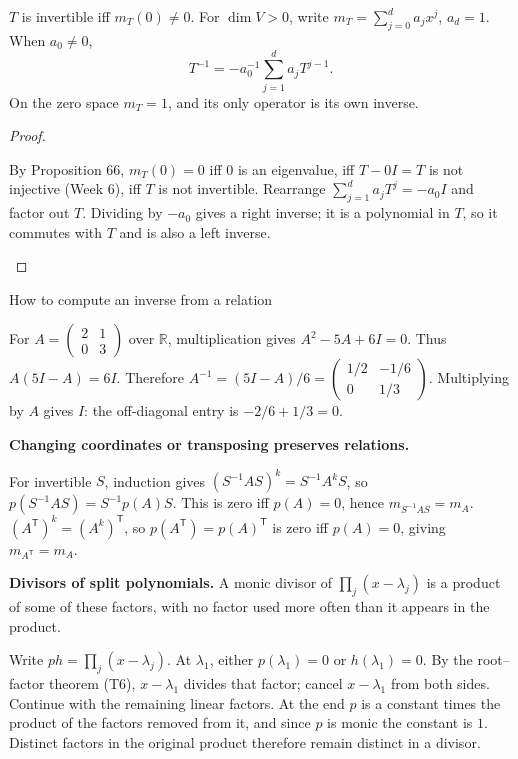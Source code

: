 \begin{proposition*}
$T$ is invertible iff $m_T(0)\ne0$. For $\dim V>0$, write $m_T=\sum_{j=0}^d a_jx^j$, $a_d=1$. When $a_0\ne0$,
\[T^{-1}=-a_0^{-1}\sum_{j=1}^d a_jT^{j-1}.\]
On the zero space $m_T=1$, and its only operator is its own inverse.
\end{proposition*}
\begin{prob}\begin{proof}\begin{steps}
\ii By Proposition 66, $m_T(0)=0$ iff $0$ is an eigenvalue, iff $T-0I=T$ is not injective (Week 6), iff $T$ is not invertible.
\ii Rearrange $\sum_{j=1}^d a_jT^j=-a_0I$ and factor out $T$. Dividing by $-a_0$ gives a right inverse; it is a polynomial in $T$, so it commutes with $T$ and is also a left inverse.
\end{steps}\end{proof}\end{prob}
\begin{methodbox}{How to compute an inverse from a relation}
\begin{enumerate}[label=\arabic*.,leftmargin=1.5em,itemsep=2pt,topsep=2pt]
\ii For $A=\left(\begin{smallmatrix}2&1\\0&3\end{smallmatrix}\right)$ over $\mathbb R$, multiplication gives $A^2-5A+6I=0$. Thus $A(5I-A)=6I$.
\ii Therefore $A^{-1}=(5I-A)/6=\left(\begin{smallmatrix}1/2&-1/6\\0&1/3\end{smallmatrix}\right)$. Multiplying by $A$ gives $I$: the off-diagonal entry is $-2/6+1/3=0$.
\end{enumerate}
\end{methodbox}
\begin{prob}\textbf{Changing coordinates or transposing preserves relations.}
\begin{steps}
\ii For invertible $S$, induction gives $(S^{-1}AS)^k=S^{-1}A^kS$, so $p(S^{-1}AS)=S^{-1}p(A)S$. This is zero iff $p(A)=0$, hence $m_{S^{-1}AS}=m_A$.
\ii $(A^{\mathsf T})^k=(A^k)^{\mathsf T}$, so $p(A^{\mathsf T})=p(A)^{\mathsf T}$ is zero iff $p(A)=0$, giving $m_{A^{\mathsf T}}=m_A$.
\end{steps}\end{prob}
\begin{prob}\textbf{Divisors of split polynomials.}
A monic divisor of $\prod_j(x-\lambda_j)$ is a product of some of these factors, with no factor used more often than it appears in the product.
\begin{steps}
\ii Write $ph=\prod_j(x-\lambda_j)$. At $\lambda_1$, either $p(\lambda_1)=0$ or $h(\lambda_1)=0$. By the root--factor theorem (T6), $x-\lambda_1$ divides that factor; cancel $x-\lambda_1$ from both sides.
\ii Continue with the remaining linear factors. At the end $p$ is a constant times the product of the factors removed from it, and since $p$ is monic the constant is $1$. Distinct factors in the original product therefore remain distinct in a divisor.
\end{steps}\end{prob}
